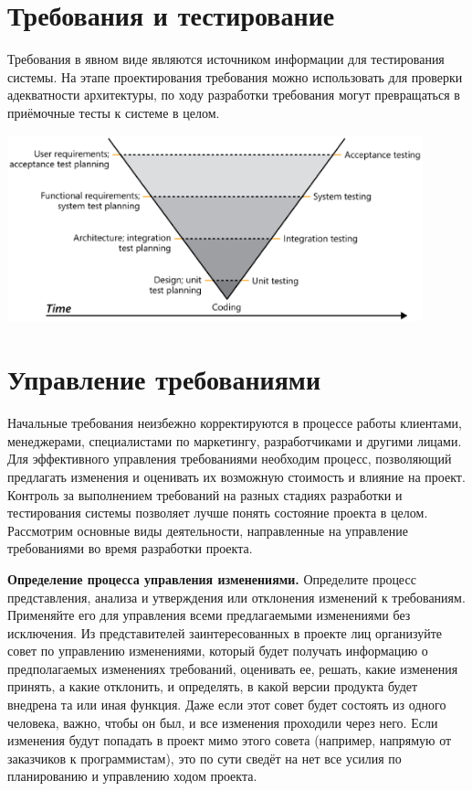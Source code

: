 \documentclass{../../text-style}
\begin{document}
\section{Требования и тестирование}

Требования в явном виде являются источником информации для тестирования системы. На этапе проектирования требования можно использовать для проверки адекватности архитектуры, по ходу разработки требования могут превращаться в приёмочные тесты к системе в целом.

\begin{center}
    \includegraphics[width=0.9\textwidth]{requirementsAndTesting.png}
\end{center}

\section{Управление требованиями}

Начальные требования неизбежно корректируются в процессе работы клиентами, менеджерами, специалистами по маркетингу, разработчиками и другими лицами. Для эффективного управления требованиями необходим процесс, позволяющий предлагать изменения и оценивать их возможную стоимость и влияние на проект. Контроль за выполнением требований на разных стадиях разработки и тестирования системы позволяет лучше понять состояние проекта в целом. Рассмотрим основные виды деятельности, направленные на управление требованиями во время разработки проекта.

\textbf{Определение процесса управления изменениями.} Определите процесс представления, анализа и утверждения или отклонения изменений к требованиям. Применяйте его для управления всеми предлагаемыми изменениями без исключения. Из представителей заинтересованных в проекте лиц организуйте совет по управлению изменениями, который будет получать информацию о предполагаемых изменениях требований, оценивать ее, решать, какие изменения принять, а какие отклонить, и определять, в какой версии продукта будет внедрена та или иная функция. Даже если этот совет будет состоять из одного человека, важно, чтобы он был, и все изменения проходили через него. Если изменения будут попадать в проект мимо этого совета (например, напрямую от заказчиков к программистам), это по сути сведёт на нет все усилия по планированию и управлению ходом проекта.
\end{document}
